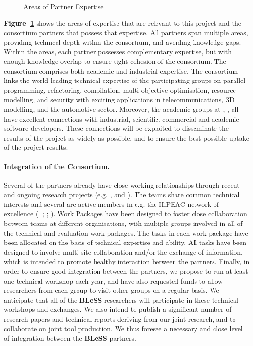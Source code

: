 \documentclass[a4paper,11pt]{article}
\newcommand{\project}[1]{\textbf{#1}\xspace}
\newcommand{\BLESS}{\project{BLeSS}}
\newcommand{\TheProject}{\BLESS}
\begin{document}
\begin{figure}[t]
\begin{center}
\end{center}
\vspace{-0.3in}
\caption{Areas of Partner Expertise}
\label{fig:consortium}
\end{figure}

\textbf{Figure~\ref{fig:consortium}} shows the areas of expertise that
are relevant to this project and the consortium partners that
possess that expertise.  All partners span multiple areas,
providing technical depth within the consortium, and avoiding
knowledge gaps.  Within the areas, each partner possesses
complementary expertise, but with enough knowledge overlap to
ensure tight cohesion of the consortium. The consortium
comprises both academic and industrial expertise.
The consortium links the world-leading technical expertise of
the participating groups on parallel programming,
refactoring,
compilation,
multi-objective optimisation,
resource modelling,
and security with exciting applications in telecommunications, 3D modelling, and the automotive sector.
Moreover, the academic groups at \SAshort{}, \INRIAshort{},  all have
excellent connections with industrial, scientific, commercial
and academic software developers.  These connections will be exploited
to disseminate the results of the project as widely as possible,
and to ensure the best possible uptake of the project results.

\paragraph*{Integration of the Consortium.}

Several of the partners already have close working relationships through
recent and ongoing research projects (e.g. \paraphrase, \rephrase and \teamplay).
The teams share common technical interests and several are active members in e.g. the
HiPEAC network of excellence (\SAshort{}; \INRIAshort{}; \PRLshort{}; \SCCHshort{}).
Work Packages have been designed to foster close collaboration
between teams at different organisations, with multiple groups involved in all of
the technical and evaluation work packages. The tasks in 
each work package have been allocated on the basis of
technical expertise and ability. All tasks have been designed to involve multi-site
collaboration and/or the exchange of information, which is
intended to promote healthy interaction between the partners.
Finally, in order to ensure good integration between the partners,
we propose to run at least one technical workshop each year, and
have also requested funds to allow researchers from each group
to visit other groups on a regular basis.  We anticipate that
all of the \TheProject{} researchers will participate in these
technical workshops and exchanges.  We also intend to publish a significant
number of research papers and technical reports deriving from our joint research,
and to collaborate on joint tool production. 
We thus foresee a necessary and close level of integration between
the \TheProject{} partners.
\end{document}
